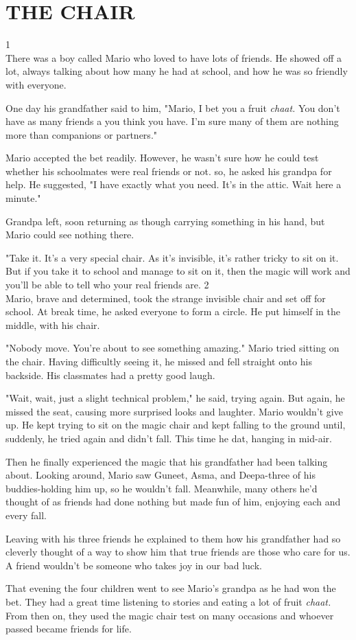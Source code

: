 \chapter{THE CHAIR}
\vspace{2.1in}
1\\
There was a boy called Mario who loved to have lots of friends. He showed off a lot, always talking about how many he had at school, and how he was so friendly with everyone.
\par
One day his grandfather said to him, "Mario, I bet you a fruit \textit{chaat.} You don't have as many friends a you think you have. I'm sure many of them are nothing more than companions or partners."
\par
Mario accepted the bet readily. However, he wasn't sure how he could test whether his schoolmates were real friends or not. so, he asked his grandpa for help. He suggested, "I have exactly what you need. It's in the attic. Wait here a minute."
\par
Grandpa left, soon returning as though carrying something in his hand, but Mario could see nothing there.
\par
"Take it. It's a very special chair. As it's invisible, it's rather tricky to sit on it. But if you take it to school and manage to sit on it, then the magic will work and you'll be able to tell who your real friends are.
\vspace{0.5in}
2\\
Mario, brave and determined, took the strange invisible chair and set off for school. At break time, he asked everyone to form a circle. He put himself in the middle, with his chair.
\par
"Nobody move. You're about to see something amazing."
\vspace{1.2in}
Mario tried sitting on the chair. Having difficultly seeing it, he missed and fell straight onto his backside. His classmates had a pretty good laugh.
\par
"Wait, wait, just a slight technical problem," he said, trying again. But again, he missed the seat, causing more surprised looks and laughter. Mario wouldn't give up. He kept trying to sit on the magic chair and kept falling to the ground until, suddenly, he tried again and didn't fall. This time he dat, hanging in mid-air.
\par
Then he finally experienced the magic that his grandfather had been talking about. Looking around, Mario saw Guneet, Asma, and Deepa-three of his buddies-holding him up, so he wouldn't fall. Meanwhile, many others he'd thought of as friends had done nothing but made fun of him, enjoying each and every fall.
\par
Leaving with his three friends he explained to them how his grandfather had so cleverly thought of a way to show him that true friends are those who care for us. A friend wouldn't be someone who takes joy in our bad luck.
\par
That evening the four children went to see Mario's grandpa as he had won the bet. They had a great time listening to stories and eating a lot of fruit \textit{chaat.} From then on, they used the magic chair test on many occasions and whoever passed became friends for life. 